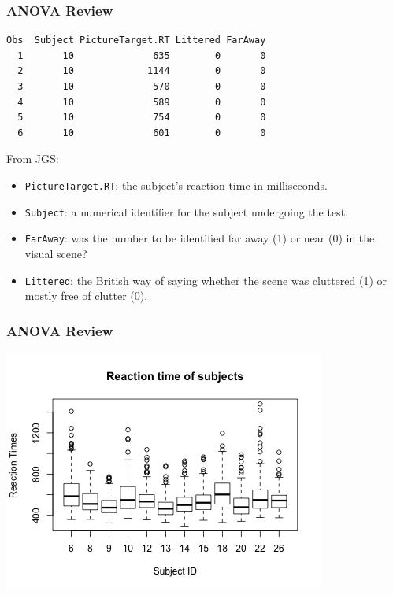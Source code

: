 \documentclass[slidestop,compress,mathserif,12pt,t,professionalfonts,xcolor=table]{beamer}
\begin{document}

\begin{frame}[fragile]
  \frametitle{ANOVA Review}
  
\begin{center}
{\small
\begin{verbatim}
Obs  Subject PictureTarget.RT Littered FarAway
  1       10              635        0       0
  2       10             1144        0       0
  3       10              570        0       0
  4       10              589        0       0
  5       10              754        0       0
  6       10              601        0       0
\end{verbatim}
}
\end{center}

\small
{\tiny From JGS:}
\begin{itemize}
\item \texttt{PictureTarget.RT}: the subject’s reaction time in milliseconds.
\item \texttt{Subject}: a numerical identifier for the subject undergoing the test.
\item \texttt{FarAway}: was the number to be identified far away (1) or near (0) in the visual scene?
\item \texttt{Littered}: the British way of saying whether the scene was cluttered (1) or mostly free of clutter (0).
\end{itemize}

\end{frame}



\begin{frame}
  \frametitle{ANOVA Review}


  \begin{center}
  \includegraphics[scale=0.6]{figures/rxntime-boxplots.png}
  \end{center}

\end{frame}
\end{document}

